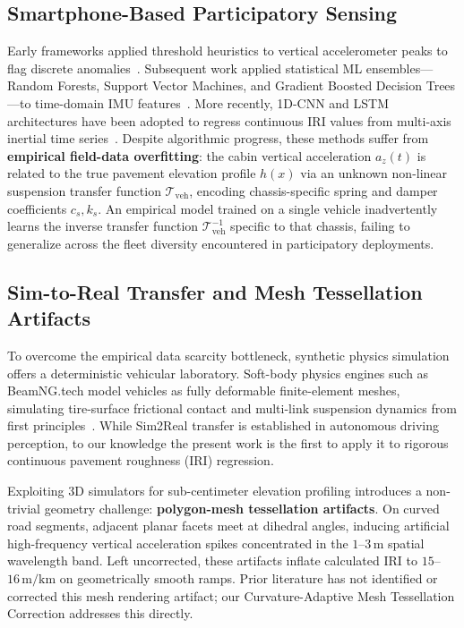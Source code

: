 \documentclass[conference]{IEEEtran}
\begin{document}
\subsection{Smartphone-Based Participatory Sensing}
Early frameworks applied threshold heuristics to vertical accelerometer peaks to flag discrete anomalies~\cite{11,14}. Subsequent work applied statistical ML ensembles—Random Forests, Support Vector Machines, and Gradient Boosted Decision Trees—to time-domain IMU features~\cite{6,7}. More recently, 1D-CNN and LSTM architectures have been adopted to regress continuous IRI values from multi-axis inertial time series~\cite{8}. Despite algorithmic progress, these methods suffer from \textbf{empirical field-data overfitting}: the cabin vertical acceleration $a_z(t)$ is related to the true pavement elevation profile $h(x)$ via an unknown non-linear suspension transfer function $\mathcal{T}_{\text{veh}}$, encoding chassis-specific spring and damper coefficients $c_s, k_s$. An empirical model trained on a single vehicle inadvertently learns the inverse transfer function $\mathcal{T}_{\text{veh}}^{-1}$ specific to that chassis, failing to generalize across the fleet diversity encountered in participatory deployments.

\subsection{Sim-to-Real Transfer and Mesh Tessellation Artifacts}
To overcome the empirical data scarcity bottleneck, synthetic physics simulation offers a deterministic vehicular laboratory. Soft-body physics engines such as BeamNG.tech model vehicles as fully deformable finite-element meshes, simulating tire-surface frictional contact and multi-link suspension dynamics from first principles~\cite{15}. While Sim2Real transfer is established in autonomous driving perception, to our knowledge the present work is the first to apply it to rigorous continuous pavement roughness (IRI) regression.

Exploiting 3D simulators for sub-centimeter elevation profiling introduces a non-trivial geometry challenge: \textbf{polygon-mesh tessellation artifacts}. On curved road segments, adjacent planar facets meet at dihedral angles, inducing artificial high-frequency vertical acceleration spikes concentrated in the $1$--$3\,\text{m}$ spatial wavelength band. Left uncorrected, these artifacts inflate calculated IRI to $15$--$16\,\text{m/km}$ on geometrically smooth ramps. Prior literature has not identified or corrected this mesh rendering artifact; our Curvature-Adaptive Mesh Tessellation Correction addresses this directly.
\end{document}
